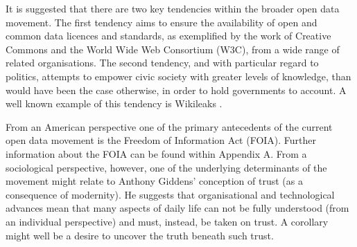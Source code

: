 It is suggested that there are two key tendencies within the broader open data movement.
The first tendency aims to ensure the availability of open and common data licences and standards, as exemplified by the work of Creative Commons \cite{creative-commons} and the World Wide Web Consortium \cite{w3c} (W3C), from a wide range of related organisations.
The second tendency, and with particular regard to politics, attempts to empower civic society with greater levels of knowledge, than would have been the case otherwise, in order to hold governments to account.
A well known example of this tendency is Wikileaks \cite{wikileaks}.  

From an American perspective one of the primary antecedents of the current open data movement is the Freedom of Information Act \cite{foia} (FOIA). Further information about the FOIA can be found within Appendix A.
From a sociological perspective, however, one of the underlying determinants of the movement might relate to Anthony Giddens' conception of trust \cite{anthony-giddens-consequences-of-modernity} (as a consequence of modernity).
He suggests that organisational and technological advances mean that many aspects of daily life can not be fully understood (from an individual perspective)
and must, instead, be taken on trust.
A corollary might well be a desire to uncover the truth beneath such trust.